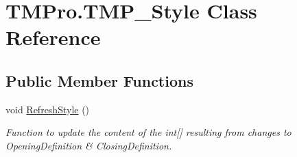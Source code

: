 \hypertarget{class_t_m_pro_1_1_t_m_p___style}{}\section{T\+M\+Pro.\+T\+M\+P\+\_\+\+Style Class Reference}
\label{class_t_m_pro_1_1_t_m_p___style}
\subsection*{Public Member Functions}
\begin{DoxyCompactItemize}
\item 
void \mbox{\hyperlink{class_t_m_pro_1_1_t_m_p___style_a45cd2cf30f163d32c1bfa91914852154}{Refresh\+Style}} ()
\begin{DoxyCompactList}\small\item\em Function to update the content of the int\mbox{[}\mbox{]} resulting from changes to Opening\+Definition \& Closing\+Definition. \end{DoxyCompactList}\end{DoxyCompactItemize}
